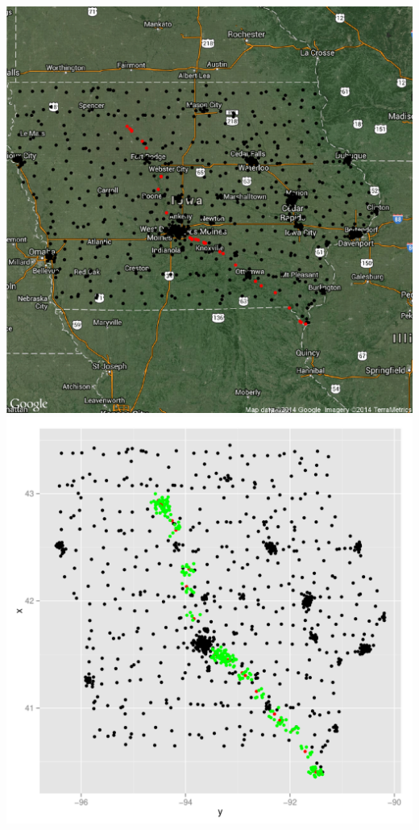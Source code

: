 \documentclass{article}\usepackage[]{graphicx}\usepackage[]{color}
\makeatletter
\def\maxwidth{ %
  \ifdim\Gin@nat@width>\linewidth
    \linewidth
  \else
    \Gin@nat@width
  \fi
}
\newenvironment{knitrout}{}{} %
\makeatother
\begin{document}
\begin{itemize}
\begin{knitrout}
{\includegraphics[width=\maxwidth]{figure/minimal-census5} 
\includegraphics[width=\maxwidth]{figure/minimal-census6} 

}




\end{knitrout}
\end{itemize}
\end{document}
